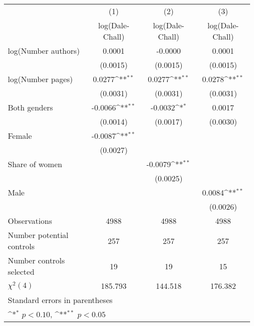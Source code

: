 {
\def\sym#1{\ifmmode^{#1}\else\(^{#1}\)\fi}
\begin{tabular}{l*{3}{c}}
\hline\hline
                    &\multicolumn{1}{c}{(1)}&\multicolumn{1}{c}{(2)}&\multicolumn{1}{c}{(3)}\\
                    &\multicolumn{1}{c}{log(Dale-Chall)}&\multicolumn{1}{c}{log(Dale-Chall)}&\multicolumn{1}{c}{log(Dale-Chall)}\\
\hline
\hspace{3mm}log(Number authors)&      0.0001        &     -0.0000        &      0.0001        \\
                    &    (0.0015)        &    (0.0015)        &    (0.0015)        \\
[1em]
\hspace{3mm}log(Number pages)&      0.0277\sym{**}&      0.0277\sym{**}&      0.0278\sym{**}\\
                    &    (0.0031)        &    (0.0031)        &    (0.0031)        \\
[1em]
\hspace{3mm}Both genders&     -0.0066\sym{**}&     -0.0032\sym{*} &      0.0017        \\
                    &    (0.0014)        &    (0.0017)        &    (0.0030)        \\
[1em]
\hspace{3mm}Female  &     -0.0087\sym{**}&                    &                    \\
                    &    (0.0027)        &                    &                    \\
[1em]
\hspace{3mm}Share of women&                    &     -0.0079\sym{**}&                    \\
                    &                    &    (0.0025)        &                    \\
[1em]
\hspace{3mm}Male    &                    &                    &      0.0084\sym{**}\\
                    &                    &                    &    (0.0026)        \\
\hline
Observations        &        4988        &        4988        &        4988        \\
Number potential controls&         257        &         257        &         257        \\
Number controls selected&          19        &          19        &          15        \\
$\chi^2(4)$         &     185.793        &     144.518        &     176.382        \\
\hline\hline
\multicolumn{4}{l}{\footnotesize Standard errors in parentheses}\\
\multicolumn{4}{l}{\footnotesize \sym{*} \(p<0.10\), \sym{**} \(p<0.05\)}\\
\end{tabular}
}
